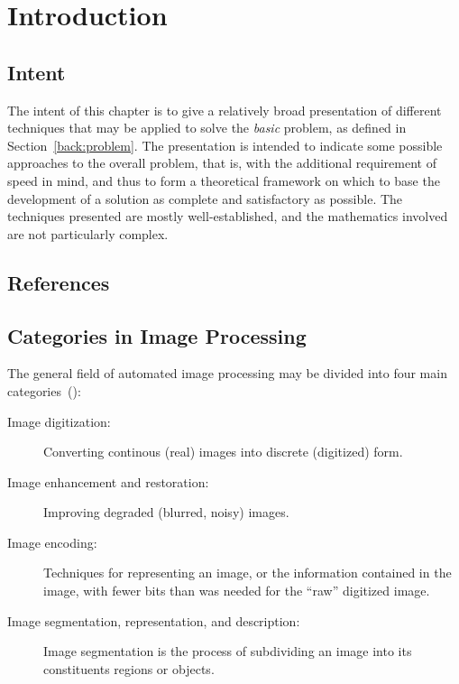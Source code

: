 
\section{Introduction}
\label{image:intro}

\subsection{Intent}
\label{image:intro:intent}

The intent of this chapter is to give a relatively broad presentation
of different techniques that may be applied to solve the {\em basic\/}
problem, as defined in Section~\ref{back:problem}.  The presentation
is intended to indicate some possible approaches to the overall
problem, that is, with the additional requirement of speed in mind,
and thus to form a theoretical framework on which to base the
development of a solution as complete and satisfactory as possible.
The techniques presented are mostly well-established, and the
mathematics involved are not particularly complex.

\subsection{References}
\label{image:intro:references}

\subsection{Categories in Image Processing}
\label{image:intro:categories}

The general field of automated image processing may be divided into
four main categories~(\cite{digim}):

\begin{description}
\item[Image digitization:] Converting continous (real) images into
  discrete (digitized) form.
\item[Image enhancement and restoration:] Improving degraded (blurred,
  noisy) images.
\item[Image encoding:] Techniques for representing an image, or the
  information contained in the image, with fewer bits than was needed
  for the ``raw'' digitized image.
\item[Image segmentation, representation, and description:] Image
  segmentation is the process of subdividing an image into its
  constituents regions or objects.
\end{description}


